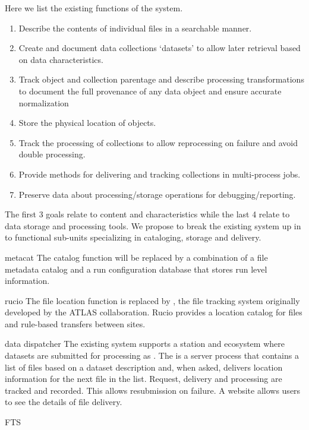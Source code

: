 Here we list the existing functions of the  system. 

\begin{enumerate}

\item	Describe the contents of individual files in a searchable manner. 

\item	Create and document data collections `datasets' to allow later retrieval based on data characteristics.

 \item	Track object and collection parentage and describe processing transformations to document the full provenance of any data object and ensure accurate normalization


 \item	Store the physical  location of objects.

 \item	Track the processing of collections to allow reprocessing on failure and avoid double processing.

 \item	Provide methods for delivering and tracking collections in multi-process jobs.

 \item	Preserve data about processing/storage operations for debugging/reporting.

\end{enumerate}
The first 3 goals relate to content and characteristics while the last 4 relate to data storage and processing tools. We propose to break the existing system up in to functional sub-units specializing in cataloging, storage and delivery. 

\begin{description}
\item{metacat}  The catalog function will be replaced by a combination of a file metadata catalog  and a run configuration database that stores run level information.
\item{rucio}  The file location function is replaced by \cite{Barisits:2019fyl}, the file tracking system originally developed by the ATLAS collaboration. Rucio provides a location catalog for files and rule-based transfers between sites. 
\item{data dispatcher} The existing system supports a station and  ecosystem where datasets are submitted for processing as .  The  is a server process that contains a list of files based on a dataset description  and, when asked, delivers location information for the next file in the list.  Request, delivery and processing are tracked and recorded. This allows resubmission on failure. A website allows users to see the details of file delivery. 
\item{FTS} 

\end{description}



